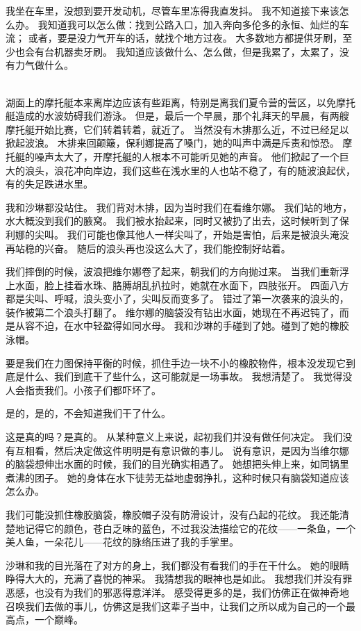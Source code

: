 \documentclass[UTF8]{ctexart}
\begin{document}
我坐在车里，没想到要开发动机，尽管车里冻得我直发抖。
我不知道接下来该怎么办。
我知道我可以怎么做：找到公路入口，加入奔向多伦多的永恒、灿烂的车流；
或者，要是没力气开车的话，就找个地方过夜。
大多数地方都提供牙刷，至少也会有台机器卖牙刷。
我知道应该做什么、怎么做，但是我累了，太累了，没有力气做什么。

~\\

湖面上的摩托艇本来离岸边应该有些距离，特别是离我们夏令营的营区，以免摩托艇造成的水波妨碍我们游泳。
但是，最后一个早晨，那个礼拜天的早晨，有两艘摩托艇开始比赛，它们转着转着，就近了。
当然没有木排那么近，不过已经足以掀起波浪。
木排来回颠簸，保利娜提高了嗓门，她的叫声中满是斥责和惊恐。
摩托艇的噪声太大了，开摩托艇的人根本不可能听见她的声音。
他们掀起了一个巨大的浪头，浪花冲向岸边，我们这些在浅水里的人也站不稳了，有的随波浪起伏，有的失足跌进水里。

我和沙琳都没站住。
我们背对木排，因为当时我们在看维尔娜。
我们站的地方，水大概没到我们的腋窝。
我们被水抬起来，同时又被扔了出去，这时候听到了保利娜的尖叫。
我们可能也像其他人一样尖叫了，开始是害怕，后来是被浪头淹没再站稳的兴奋。
随后的浪头再也没这么大了，我们能控制好站着。

我们摔倒的时候，波浪把维尔娜卷了起来，朝我们的方向抛过来。
当我们重新浮上水面，脸上挂着水珠、胳膊胡乱扒拉时，她就在水面下，四肢张开。
四面八方都是尖叫、呼喊，浪头变小了，尖叫反而变多了。
错过了第一次袭来的浪头的，装作被第二个浪头打翻了。
维尔娜的脑袋没有钻出水面，她现在不再迟钝了，而是从容不迫，在水中轻盈得如同水母。
我和沙琳的手碰到了她。碰到了她的橡胶泳帽。

要是我们在力图保持平衡的时候，抓住手边一块不小的橡胶物件，根本没发现它到底是什么、我们到底干了些什么，这可能就是一场事故。
我想清楚了。
我觉得没人会指责我们。小孩子们都吓坏了。

是的，是的，不会知道我们干了什么。

这是真的吗？是真的。
从某种意义上来说，起初我们并没有做任何决定。
我们没有互相看，然后决定做这件明明是有意识做的事儿。
说有意识，是因为当维尔娜的脑袋想伸出水面的时候，我们的目光确实相遇了。
她想把头伸上来，如同锅里煮沸的团子。
她的身体在水下徒劳无益地虚弱挣扎，这种时候只有脑袋知道应该怎么办。

我们可能没抓住橡胶脑袋，橡胶帽子没有防滑设计，没有凸起的花纹。
我还能清楚地记得它的颜色，苍白乏味的蓝色，不过我没法描绘它的花纹——一条鱼，一个美人鱼，一朵花儿——花纹的脉络压进了我的手掌里。

沙琳和我的目光落在了对方的身上，我们都没有看我们的手在干什么。
她的眼睛睁得大大的，充满了喜悦的神采。
我猜想我的眼神也是如此。
我想我们并没有罪恶感，也没有为我们的邪恶得意洋洋。
感受得更多的是，我们仿佛正在做神奇地召唤我们去做的事儿，仿佛这是我们这辈子当中，让我们之所以成为自己的一个最高点，一个巅峰。
\end{document}
